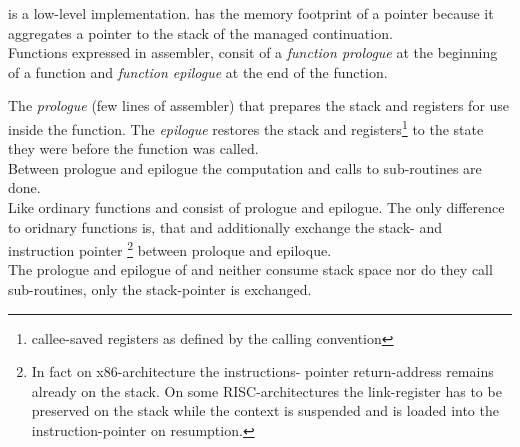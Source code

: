 
\cc is a low-level implementation. \cont has the memory footprint of a pointer
because it aggregates a pointer to the stack of the managed continuation.\\
\newline
Functions expressed in assembler, consit of a \emph{function prologue} at the
beginning of a function and \emph{function epilogue} at the end of the function.

The \emph{prologue} (few lines of assembler) that prepares the stack and
registers for use inside the function. The \emph{epilogue} restores the stack
and registers\footnote{callee-saved registers as defined by the calling
convention} to the state they were before the function was called.\\
Between prologue and epilogue the computation and calls to sub-routines are
done.\\
\newline
Like ordinary functions \resume and \resumewith consist of prologue and
epilogue. The only difference to oridnary functions is, that \resume and
\resumewith additionally exchange the stack- and instruction pointer
\footnote{In fact on x86-architecture the instructions- pointer return-address
remains already on the stack. On some RISC-architectures the link-register
has to be preserved on the stack while the context is suspended and is loaded
into the instruction-pointer on resumption.} between proloque and epiloque.\\
The prologue and epilogue of \resume and \resumewith neither consume stack space
nor do they call sub-routines, only the stack-pointer is exchanged.
